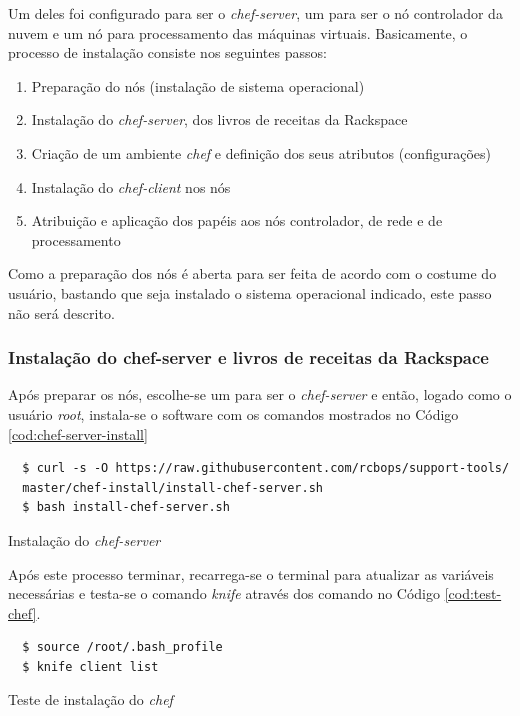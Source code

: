Um deles foi configurado para ser o \emph{chef-server}, um para ser o nó controlador
da nuvem e um nó para processamento das máquinas virtuais. Basicamente, o processo de
instalação consiste nos seguintes passos:

\begin{enumerate}
  \item Preparação do nós (instalação de sistema operacional)
  \item Instalação do \emph{chef-server}, dos livros de receitas da Rackspace
  \item Criação de um ambiente \emph{chef} e definição dos seus atributos (configurações)
  \item Instalação do \emph{chef-client} nos nós
  \item Atribuição e aplicação dos papéis aos nós controlador, de rede e de
    processamento
\end{enumerate}

Como a preparação dos nós é aberta para ser feita de acordo com o costume do usuário,
bastando que seja instalado o sistema operacional indicado, este passo não será
descrito.

\subsubsection{Instalação do chef-server e livros de receitas
da Rackspace}

Após preparar os nós, escolhe-se um para ser o \emph{chef-server} e então,
logado como o usuário \emph{root}, instala-se o software com os comandos mostrados
no Código \ref{cod:chef-server-install}

\begin{listing}
\begin{verbatim}
  $ curl -s -O https://raw.githubusercontent.com/rcbops/support-tools/
  master/chef-install/install-chef-server.sh
  $ bash install-chef-server.sh
\end{verbatim}
\caption{Instalação do \emph{chef-server}}
\label{cod:chef-server-install}
\end{listing}

Após este processo terminar, recarrega-se o terminal para atualizar as variáveis
necessárias e testa-se o comando \emph{knife} através dos comando no Código \ref{cod:test-chef}.

\begin{listing}
\begin{verbatim}
  $ source /root/.bash_profile
  $ knife client list
\end{verbatim}
\caption{Teste de instalação do \emph{chef}}
\label{cod:test-chef}
\end{listing}

